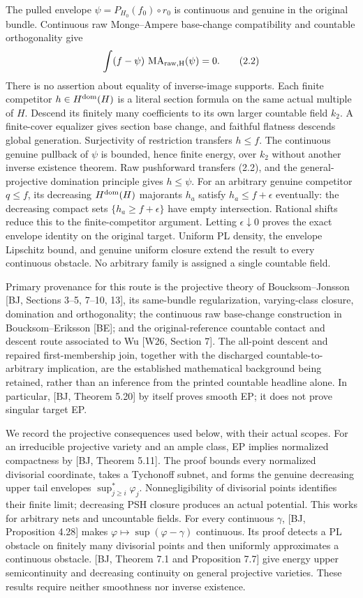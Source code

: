 \documentclass[
  10pt,
]{article}
\begin{document}
The pulled envelope \(\psi=P_{H_0}(f_0)\circ r_0\) is continuous and
genuine in the original bundle. Continuous raw Monge--Ampere base-change
compatibility and countable orthogonality give \[
       \int(f-\psi)\,\operatorname{MA}_{\rm raw,H}(\psi)=0.       \tag{2.2}
\] There is no assertion about equality of inverse-image supports. Each
finite competitor \(h\in H^{\rm dom}(H)\) is a literal section formula
on the same actual multiple of \(H\). Descend its finitely many
coefficients to its own larger countable field \(k_2\). A finite-cover
equalizer gives section base change, and faithful flatness descends
global generation. Surjectivity of restriction transfers \(h\leq f\).
The continuous genuine pullback of \(\psi\) is bounded, hence finite
energy, over \(k_2\) without another inverse existence theorem. Raw
pushforward transfers (2.2), and the general-projective domination
principle gives \(h\leq\psi\). For an arbitrary genuine competitor
\(q\leq f\), its decreasing \(H^{\rm dom}(H)\) majorants \(h_a\) satisfy
\(h_a\leq f+\epsilon\) eventually: the decreasing compact sets
\(\{h_a\geq f+\epsilon\}\) have empty intersection. Rational shifts
reduce this to the finite-competitor argument. Letting
\(\epsilon\downarrow0\) proves the exact envelope identity on the
original target. Uniform PL density, the envelope Lipschitz bound, and
genuine uniform closure extend the result to every continuous obstacle.
No arbitrary family is assigned a single countable field.

Primary provenance for this route is the projective theory of
Boucksom--Jonsson {[}BJ, Sections 3--5, 7--10, 13{]}, its same-bundle
regularization, varying-class closure, domination and orthogonality; the
continuous raw base-change construction in Boucksom--Eriksson {[}BE{]};
and the original-reference countable contact and descent route
associated to Wu {[}W26, Section 7{]}. The all-point descent and
repaired first-membership join, together with the discharged
countable-to-arbitrary implication, are the established mathematical
background being retained, rather than an inference from the printed
countable headline alone. In particular, {[}BJ, Theorem 5.20{]} by
itself proves smooth EP; it does not prove singular target EP.

We record the projective consequences used below, with their actual
scopes. For an irreducible projective variety and an ample class, EP
implies normalized compactness by {[}BJ, Theorem 5.11{]}. The proof
bounds every normalized divisorial coordinate, takes a Tychonoff subnet,
and forms the genuine decreasing upper tail envelopes
\(\sup_{j\geq i}^*\varphi_j\). Nonnegligibility of divisorial points
identifies their finite limit; decreasing PSH closure produces an actual
potential. This works for arbitrary nets and uncountable fields. For
every continuous \(\gamma\), {[}BJ, Proposition 4.28{]} makes
\(\varphi\mapsto\sup(\varphi-\gamma)\) continuous. Its proof detects a
PL obstacle on finitely many divisorial points and then uniformly
approximates a continuous obstacle. {[}BJ, Theorem 7.1 and Proposition
7.7{]} give energy upper semicontinuity and decreasing continuity on
general projective varieties. These results require neither smoothness
nor inverse existence.
\end{document}
